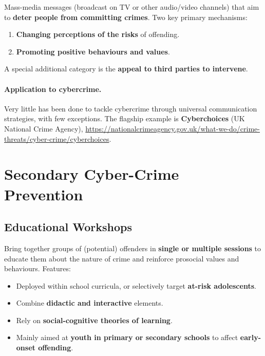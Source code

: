 \documentclass[11pt,a4paper,openany]{report}
\theoremstyle{definition}
\theoremstyle{plain}
\theoremstyle{remark}
\begin{document}
Mass-media messages (broadcast on TV or other audio/video channels) that aim to \textbf{deter people from committing crimes}. Two key primary mechanisms:
\begin{enumerate}
    \item \textbf{Changing perceptions of the risks} of offending.
    \item \textbf{Promoting positive behaviours and values}.
\end{enumerate}
A special additional category is the \textbf{appeal to third parties to intervene}.

\paragraph{Application to cybercrime.} Very little has been done to tackle cybercrime through universal communication strategies, with few exceptions. The flagship example is \textbf{Cyberchoices} (UK National Crime Agency), \url{https://nationalcrimeagency.gov.uk/what-we-do/crime-threats/cyber-crime/cyberchoices}.

\section{Secondary Cyber-Crime Prevention}

\subsection{Educational Workshops}

Bring together groups of (potential) offenders in \textbf{single or multiple sessions} to educate them about the nature of crime and reinforce prosocial values and behaviours. Features:
\begin{itemize}
    \item Deployed within school curricula, or selectively target \textbf{at-risk adolescents}.
    \item Combine \textbf{didactic and interactive} elements.
    \item Rely on \textbf{social-cognitive theories of learning}.
    \item Mainly aimed at \textbf{youth in primary or secondary schools} to affect \textbf{early-onset offending}.
\end{itemize}
\end{document}
